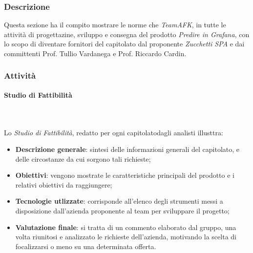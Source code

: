 		\subsubsection{Descrizione}
		Questa sezione ha il compito mostrare le norme che \textit{TeamAFK}, in tutte le attività di progettazine, sviluppo e consegna del prodotto \textit{Predire in Grafana}, con lo scopo di diventare fornitori del capitolato  dal proponente \textit{Zucchetti SPA} e dai committenti Prof. Tullio Vardanega e Prof. Riccardo Cardin.
		\subsubsection{Attività}
			\paragraph{Studio di Fattibilità} \mbox{} \\ \mbox{} \\
			Lo \textit{Studio di Fattibilità}, redatto per ogni capitolato\glo dagli analisti illusttra:
			\begin{itemize}
				\item[] \textbf{Descrizione generale}: sintesi delle informazioni generali del capitolato, e delle circostanze da cui sorgono tali richieste;
				\item[] \textbf{Obiettivi}: vengono mostrate le caratteristiche principali del prodotto e i relativi obiettivi da raggiungere;
				\item[] \textbf{Tecnologie utlizzate}: corrisponde all'elenco degli strumenti messi a disposizione dall'azienda proponente al team per sviluppare il progetto;
				\item[] \textbf{Valutazione finale}: si tratta di un commento elaborato dal gruppo, una volta riunitosi e analizzato le  richieste dell'azienda, motivando la scelta di focalizzarsi o meno su una determinata offerta.
			\end{itemize}

